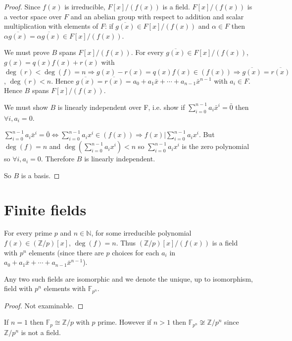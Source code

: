 \begin{proof}
	Since $f(x)$ is irreducible, $F[x] / (f(x))$ is a field. $F[x]/(f(x))$ is a vector space over $F$ and an abelian group with respect to addition and scalar multiplication with elements of $F$: if $\overline{g(x)} \in F[x] / (f(x))$ and $\alpha \in F$ then $\alpha \overline{g(x)} = \overline{\alpha g(x)} \in F[x] / (f(x))$.

	We must prove $B$ spans $F[x] / (f(x))$. For every $\overline{g(x)} \in F[x] / (f(x))$, $g(x) = q(x) f(x) + r(x)$ with $\deg(r) < \deg(f) = n \Rightarrow g(x) - r(x) = q(x) f(x) \in (f(x)) \Rightarrow \overline{g(x)} = \overline{r(x)}$, $\deg(r) < n$. Hence $\overline{g(x)} = \overline{r(x)} = a_0 + a_1 \bar{x} + \cdots + a_{n - 1} \bar{x}^{n - 1}$ with $a_i \in F$. Hence $B$ spans $F[x] / (f(x))$.

	We must show $B$ is linearly independent over F, i.e. show if $\sum_{i = 0}^{n - 1} a_i \bar{x}^i = \bar{0}$ then $\forall i, a_i = 0$.

	$\sum_{i = 0}^{n - 1} a_i \bar{x}^i = \bar{0} \Leftrightarrow \sum_{i = 0}^{n - 1} a_i x^i \in (f(x)) \Rightarrow f(x) | \sum_{i = 0}^{n - 1} a_i x^i$. But $\deg(f) = n$ and $\deg(\sum_{i = 0}^{n - 1} a_i x^i) < n$ so $\sum_{i = 0}^{n - 1} a_i x^i$ is the zero polynomial so $\forall i, a_i = 0$. Therefore $B$ is linearly independent.

	So $B$ is a basis.
\end{proof}

\section{Finite fields}

\begin{theorem}
	For every prime $p$ and $n \in \mathbb{N}$, for some irreducible polynomial $f(x) \in (\mathbb{Z} / p)[x]$, $\deg(f) = n$. Thus $(\mathbb{Z} / p)[x] / (f(x))$ is a field with $p^n$ elements (since there are $p$ choices for each $a_i$ in $a_0 + a_1 \bar{x} + \cdots + a_{n - 1}\bar{x}^{n - 1}$).

	Any two such fields are isomorphic and we denote the unique, up to isomorphism, field with $p^n$ elements with $\mathbb{F}_{p^n}$.
\end{theorem}

\begin{proof}
	Not examinable.
\end{proof}

\begin{remark}
	If $n = 1$ then $\mathbb{F}_p \cong \mathbb{Z} / p$ with $p$ prime. However if $n > 1$ then $\mathbb{F}_{p^n} \not\cong \mathbb{Z} / p^n$ since $\mathbb{Z} / p^n$ is not a field.
\end{remark}

